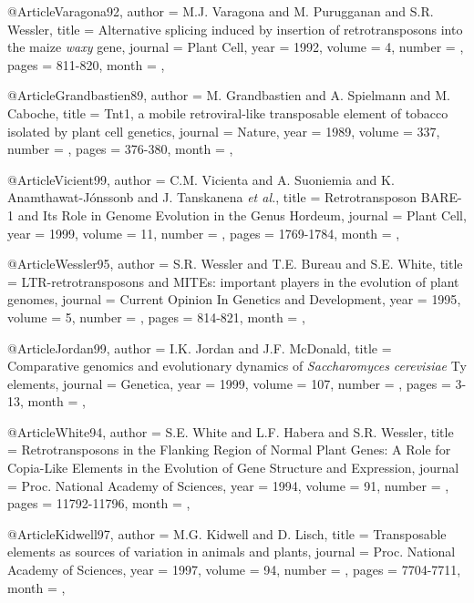 @Article{Varagona92,
  author =   {M.J. Varagona and M. Purugganan and S.R. Wessler},
  title =    {Alternative splicing induced by insertion of retrotransposons into the maize {\it waxy} gene},
  journal =  {Plant Cell},
  year =     {1992},
  volume =   {4},
  number =   {},
  pages =    {811-820},
  month =    {},
}


@Article{Grandbastien89,
  author =   {M. Grandbastien and A. Spielmann and M. Caboche},
  title =    {Tnt1, a mobile retroviral-like transposable element of tobacco isolated by plant cell genetics},
  journal =  {Nature},
  year =     {1989},
  volume =   {337},
  number =   {},
  pages =    {376-380},
  month =    {},
}


@Article{Vicient99,
  author =   {C.M. Vicienta and A. Suoniemia and K. Anamthawat-Jónssonb and J. Tanskanena {\it et al.}},
  title =    {{Retrotransposon {BARE-1} and Its Role in Genome Evolution in the Genus Hordeum}},
  journal =  {Plant Cell},
  year =     {1999},
  volume =   {11},
  number =   {},
  pages =    {1769-1784},
  month =    {},
}


@Article{Wessler95,
  author =   {S.R. Wessler and T.E.  Bureau and S.E. White},
  title =    {{LTR-retrotransposons and MITEs: important players in the evolution of plant genomes}},
  journal =  {Current Opinion In Genetics and Development},
  year =     {1995},
  volume =   {5},
  number =   {},
  pages =    {814-821},
  month =    {},
}

@Article{Jordan99,
  author =   {I.K. Jordan and J.F. McDonald},
  title =    {{Comparative genomics and evolutionary dynamics of {\it Saccharomyces cerevisiae} Ty elements}},
  journal =  {Genetica},
  year =     {1999},
  volume =   {107},
  number =   {},
  pages =    {3-13},
  month =    {},
}

@Article{White94,
  author =   {S.E. White and L.F. Habera and S.R. Wessler},
  title =    {{Retrotransposons in the Flanking Region of Normal Plant Genes: A Role for Copia-Like Elements in the Evolution of Gene Structure and Expression}},
  journal =  {Proc. National Academy of Sciences},
  year =     {1994},
  volume =   {91},
  number =   {},
  pages =    {11792-11796},
  month =    {},
}


@Article{Kidwell97,
  author =   {M.G. Kidwell and D. Lisch},
  title =    {Transposable elements as sources of variation in animals and plants},
  journal =  {Proc. National Academy of Sciences},
  year =     {1997},
  volume =   {94},
  number =   {},
  pages =    {7704-7711},
  month =    {},
}

